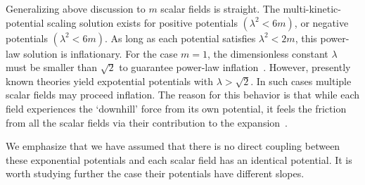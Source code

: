 \documentclass[a4paper,12pt]{article}
\begin{document}
Generalizing above discussion to $m$ scalar fields is straight.
The multi-kinetic-potential scaling solution exists for positive
potentials $(\lambda ^2<6m)$, or negative potentials $(\lambda
^2<6m)$. As long as each potential satisfies $\lambda ^2<2m$, this
power-law solution is inflationary. For the case $m=1$, the
dimensionless constant $\lambda$ must be smaller than $\sqrt{2}$
to guarantee power-law inflation~\cite{HW}. However, presently
known theories yield expotential potentials with $\lambda
>\sqrt{2}$. In such cases multiple scalar fields may proceed
inflation. The reason for this behavior is that while each field
experiences the `downhill' force from its own potential, it feels
the friction from all the scalar fields via their contribution to
the expansion~\cite{LM}.


We emphasize that we have assumed that there is no direct coupling
between these exponential potentials and each scalar field has an
identical potential. It is worth studying further the case their
potentials have different slopes.
\end{document}

